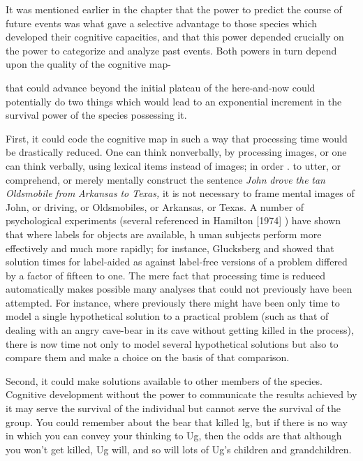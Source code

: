 It was mentioned earlier in the chapter that the power to predict the course of future events was what gave a selective advantage to those species which developed their cognitive capacities, and that this power depended crucially on the power to categorize and analyze past events. Both powers in turn depend upon the quality of the cognitive map-

that could advance beyond the initial plateau of the here-and-now could potentially do two things which would lead to an exponential increment in the survival power of the species possessing it.

First, it could code the cognitive map in such a way that process\-ing time would be drastically reduced. One can think nonverbally, by processing images, or one can think verbally, using lexical items instead of images; in order . to utter, or comprehend, or merely mentally con\-struct the sentence \textit{John} \textit{drove} \textit{the} \textit{tan} \textit{Oldsmobile} \textit{from} \textit{Arkansas} \textit{to Texas,} it is not necessary to frame mental images of John, or driving, or Oldsmobiles, or Arkansas, or Texas. A number of psychological experi\-ments (several referenced in Hamilton [1974] ) have shown that where labels for objects are available, h uman subjects perform more effec\-tively and much more rapidly; for instance, Glucksberg and \citet{Weisberg1966} showed that solution times for label-aided as against label-free versions of a problem differed by a factor of fifteen to one. The mere fact that processing time is reduced automatically makes possible many analyses that could not previously have been attempted. For instance, where previously there might have been only time to model a single
hypothetical solution to a practical problem (such as that of dealing with an angry cave-bear in its cave without getting killed in the process), there is now time not only to model several hypothetical solutions but also to compare them and make a choice on the basis of that comparison.

Second, it could make solutions available to other members of the species. Cognitive development without the power to communi\-cate the results achieved by it may serve the survival of the individual but cannot serve the survival of the group. You could remember about the bear that killed lg, but if there is no way in which you can convey your thinking to Ug, then the odds are that although you won't get killed, Ug will, and so will lots of Ug's children and grandchildren.

